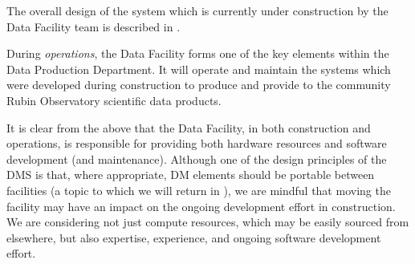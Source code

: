 The overall design of the system which is currently under construction by the Data Facility team is described in .

During \emph{operations}, the  Data Facility forms one of the key elements within the Data Production Department.
It will operate and maintain the systems which were developed during construction to produce and provide to the community Rubin Observatory scientific data products.

It is clear from the above that the Data Facility, in both construction and operations, is responsible for providing both hardware resources and software development (and maintenance).
Although one of the design principles of the \gls{DMS} is that, where appropriate, \gls{DM} elements should be portable between facilities (a topic to which we will return in ), we are mindful that moving the facility
 may have an impact on the ongoing development effort in construction. We are considering not just compute resources, which may be easily sourced from elsewhere, but also expertise, experience, and ongoing software development effort.

